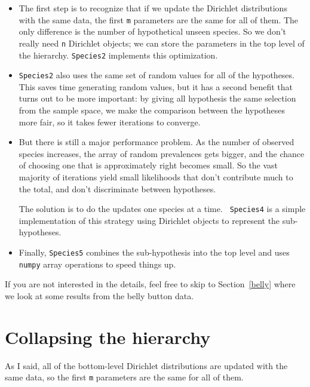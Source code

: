 \documentclass[12pt]{book}
\begin{document}
\begin{itemize}

\item The first step is to recognize that if we update the Dirichlet
  distributions with the same data, the first {\tt m} parameters are
  the same for all of them.  The only difference is the number of
  hypothetical unseen species.  So we don't really need {\tt n}
  Dirichlet objects; we can store the parameters in the top level of
  the hierarchy.  {\tt Species2} implements this optimization.

\item {\tt Species2} also uses the same set of random values for all
  of the hypotheses.  This saves time generating random values, but it
  has a second benefit that turns out to be more important: by giving
  all hypothesis the same selection from the sample space, we make
  the comparison between the hypotheses more fair, so it takes
  fewer iterations to converge.

\item But there is still a major performance problem.  As the
  number of observed species increases, the array of random
  prevalences gets bigger, and the chance of choosing one that is
  approximately right becomes small.  So the vast majority
  of iterations yield small likelihoods that don't contribute
  much to the total, and don't discriminate between hypotheses.

  The solution is to do the updates one species at a time.  {\tt
  Species4} is a simple implementation of this strategy using
  Dirichlet objects to represent the sub-hypotheses.

\item Finally, {\tt Species5} combines the sub-hypothesis into the top
  level and uses {\tt numpy} array operations to speed things up.

\end{itemize}

If you are not interested in the details, feel free to skip to
Section~\ref{belly} where we look at some results from the belly
button data.


\section{Collapsing the hierarchy}
\label{collapsing}

As I said, all of the bottom-level Dirichlet distributions are updated
with the same data, so the first {\tt m} parameters are the same for
all of them.
\end{document}
